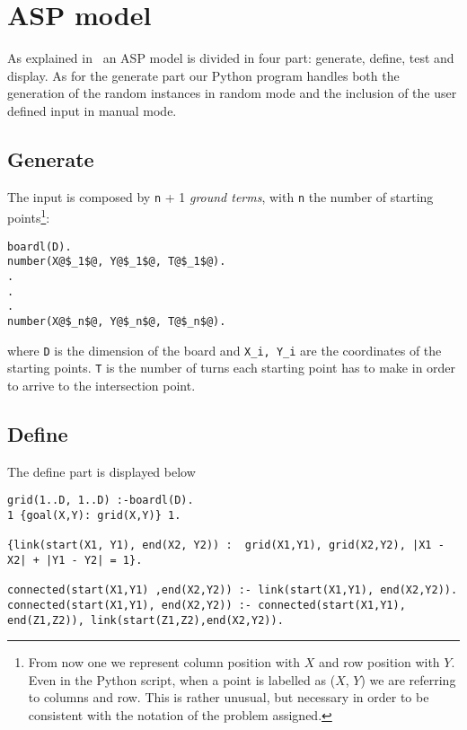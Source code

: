 \section{ASP model}
As explained in~\cite{ClingoGuide} an ASP model is divided in four part: generate, define, test and display.
As for the generate part our Python program handles both the generation of the random instances in random mode and the inclusion of the user defined input in manual mode.
\subsection{Generate}
The input is composed by \texttt{n} + 1 \emph{ground terms}, with \texttt{n} the number of starting points\footnote{From now one we represent column position with $X$ and row position with $Y$. Even in the Python script, when a point is labelled as ($X$, $Y$) we are referring to columns and row. This is rather unusual, but necessary in order to be consistent with the notation of the problem assigned.}:
\begin{verbatim}
boardl(D).
number(X@$_1$@, Y@$_1$@, T@$_1$@).
.
.
.
number(X@$_n$@, Y@$_n$@, T@$_n$@).
\end{verbatim}
where \texttt{D} is the dimension of the board and \texttt{X_i, Y_i} are the coordinates of the starting points. \texttt{T} is the number of turns each starting point has to make in order to arrive to the intersection point.

\subsection{Define}\label{sec:asp-define}
The define part is displayed below
\begin{verbatim}
grid(1..D, 1..D) :-boardl(D).
1 {goal(X,Y): grid(X,Y)} 1.

{link(start(X1, Y1), end(X2, Y2)) :  grid(X1,Y1), grid(X2,Y2), |X1 - X2| + |Y1 - Y2| = 1}. 

connected(start(X1,Y1) ,end(X2,Y2)) :- link(start(X1,Y1), end(X2,Y2)).
connected(start(X1,Y1), end(X2,Y2)) :- connected(start(X1,Y1), end(Z1,Z2)), link(start(Z1,Z2),end(X2,Y2)). 
\end{verbatim}

